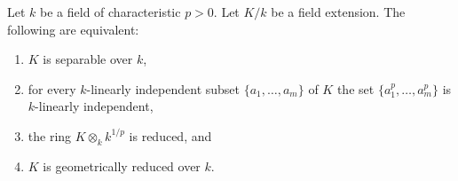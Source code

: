 \begin{lemma}
\label{editorial-source-lemma-characterize-separable-field-extensions}
Let $k$ be a field of characteristic $p > 0$.
Let $K/k$ be a field extension.
The following are equivalent:
\begin{enumerate}
\item $K$ is separable over $k$,
\item for every $k$-linearly independent subset $\{a_1, \ldots, a_m\}$
of $K$ the set $\{a^p_1, \ldots, a_m^p\}$ is $k$-linearly independent,
\item the ring $K \otimes_k k^{1/p}$ is reduced, and
\item $K$ is geometrically reduced over $k$.
\end{enumerate}
\end{lemma}

